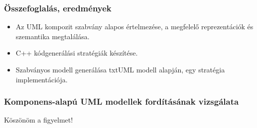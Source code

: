 \documentclass[11pt]{beamer}
\begin{document}
\begin{frame}
	\frametitle{Összefoglalás, eredmények}
	\begin{itemize}
	\item Az UML kompozit szabvány alapos értelmezése, a megfelelő reprezentációk és szemantika megtalálása.
	\item C++ kódgenerálási stratégiák készítése.
	\item Szabványos modell generálása txtUML modell alapján, egy stratégia implementációja.
	\end{itemize}
\end{frame}

\begin{frame}
	\frametitle{Komponens-alapú UML modellek fordításának vizsgálata}
	\begin{center}
		\Large{Köszönöm a figyelmet!}
	\end{center}
\end{frame}
\end{document}
